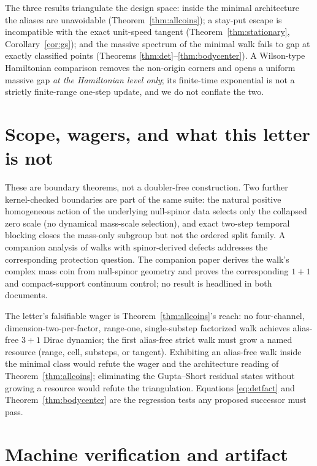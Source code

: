 \documentclass[11pt]{article}
\begin{document}
The three results triangulate the design space: inside the minimal
architecture the aliases are unavoidable (Theorem~\ref{thm:allcoins}); a
stay-put escape is incompatible with the exact unit-speed tangent
(Theorem~\ref{thm:stationary}, Corollary~\ref{cor:gs}); and the massive
spectrum of the minimal walk fails to gap at exactly classified points
(Theorems \ref{thm:det}--\ref{thm:bodycenter}).  A Wilson-type Hamiltonian
comparison removes the non-origin corners and opens a uniform massive gap
\emph{at the Hamiltonian level only}; its finite-time exponential is not a
strictly finite-range one-step update, and we do not conflate the two.

\section{Scope, wagers, and what this letter is not}
\label{sec:scope}

These are boundary theorems, not a doubler-free construction.  Two further
kernel-checked boundaries are part of the same suite: the natural positive
homogeneous action of the underlying null-spinor data selects only the
collapsed zero scale (no dynamical mass-scale selection), and exact
two-step temporal blocking closes the mass-only subgroup but not the
ordered split family.  A companion analysis of walks with
spinor-derived defects addresses the corresponding protection question.  The companion paper \cite{CompanionDerivation}
derives the walk's complex mass coin from null-spinor geometry and proves
the corresponding $1+1$ and compact-support continuum control; no result is
headlined in both documents.

The letter's falsifiable wager is Theorem~\ref{thm:allcoins}'s reach: no
four-channel, dimension-two-per-factor, range-one, single-substep
factorized walk achieves alias-free $3+1$ Dirac dynamics; the first
alias-free strict walk must grow a named resource (range, cell, substeps,
or tangent).  Exhibiting an alias-free walk inside the minimal class would
refute the wager and the architecture reading of
Theorem~\ref{thm:allcoins}; eliminating the Gupta--Short residual states
without growing a resource would refute the triangulation.  Equations
\eqref{eq:detfact} and Theorem~\ref{thm:bodycenter} are the regression
tests any proposed successor must pass.

\appendix

\section{Machine verification and artifact}
\end{document}
